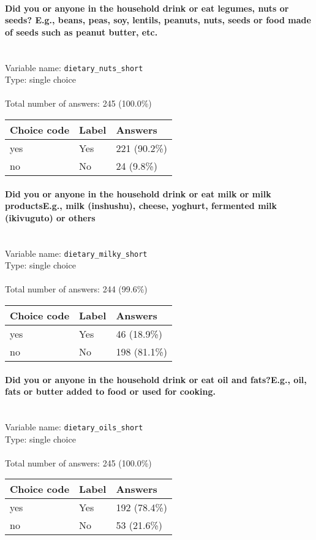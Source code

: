\documentclass[11.5pt, a4paper]{scrartcl}
\begin{document}
\paragraph{Did you or anyone in the household drink or eat legumes, nuts or seeds? E.g., beans, peas, soy, lentils, peanuts, nuts, seeds or food made of seeds such as peanut butter, etc.}
\  \\Variable name: \texttt{dietary\_nuts\_short}\\
Type: single choice\\
\\Total number of answers: 245 (100.0\%)
\\[0.2em] \begin{tabular}{p{4cm}|p{8cm}|p{3cm}}
Choice code & Label & Answers \\
\hline
yes & Yes& \cellcolor{color4}221 (90.2\%)\\
\cellcolor{mygray} no & \cellcolor{mygray}No & \cellcolor{color0}24 (9.8\%)\\
\end{tabular}
\paragraph{Did you or anyone in the household drink or eat milk or milk productsE.g., milk (inshushu), cheese, yoghurt, fermented milk (ikivuguto) or others}
\  \\Variable name: \texttt{dietary\_milky\_short}\\
Type: single choice\\
\\Total number of answers: 244 (99.6\%)
\\[0.2em] \begin{tabular}{p{4cm}|p{8cm}|p{3cm}}
Choice code & Label & Answers \\
\hline
yes & Yes& \cellcolor{color0}46 (18.9\%)\\
\cellcolor{mygray} no & \cellcolor{mygray}No & \cellcolor{color4}198 (81.1\%)\\
\end{tabular}
\paragraph{Did you or anyone in the household drink or eat oil and fats?E.g., oil, fats or butter added to food or used for cooking.}
\  \\Variable name: \texttt{dietary\_oils\_short}\\
Type: single choice\\
\\Total number of answers: 245 (100.0\%)
\\[0.2em] \begin{tabular}{p{4cm}|p{8cm}|p{3cm}}
Choice code & Label & Answers \\
\hline
yes & Yes& \cellcolor{color3}192 (78.4\%)\\
\cellcolor{mygray} no & \cellcolor{mygray}No & \cellcolor{color1}53 (21.6\%)\\
\end{tabular}
\end{document}
